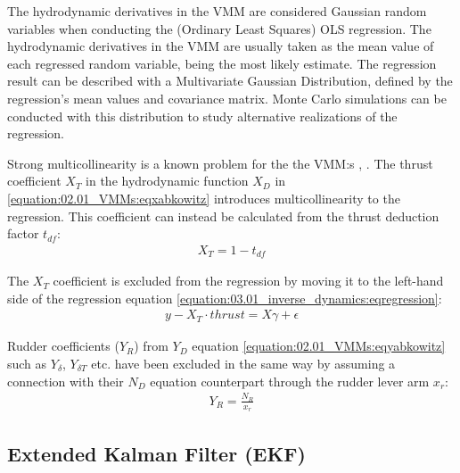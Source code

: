\documentclass[review]{elsarticle}
\begin{document}
The hydrodynamic derivatives in the VMM are considered Gaussian random variables when conducting the (Ordinary Least Squares) OLS regression. The hydrodynamic derivatives in the VMM are usually taken as the mean value of each regressed random variable, being the most likely estimate. The regression result can be described with a Multivariate Gaussian Distribution, defined by the regression's mean values and covariance matrix. Monte Carlo simulations can be conducted with this distribution to study alternative realizations of the regression.

  
Strong multicollinearity is a known problem for the the VMM:s \cite{luo_parameter_2016}, \cite{wang_quantifying_2018}.
The thrust coefficient \(X_T\) in the hydrodynamic function \(X_D\) in \autoref{equation:02.01_VMMs:eqxabkowitz} introduces multicollinearity to the regression. This coefficient can instead be calculated from the thrust deduction factor \(t_{df}\):
\begin{equation}\label{equation:03.01_inverse_dynamics:eqXthrust}
\begin{split}\displaystyle X_{T} = 1 - t_{df}\end{split}
\end{equation}
  
The \(X_T\) coefficient is excluded from the regression by moving it to the left-hand side of the regression equation \autoref{equation:03.01_inverse_dynamics:eqregression}:
\begin{equation}\label{equation:03.01_inverse_dynamics:eqexclude}
\begin{split}y-X_T \cdot thrust = X \gamma + \epsilon\end{split}
\end{equation}
  
Rudder coefficients (\(Y_R\)) from \(Y_D\) equation \autoref{equation:02.01_VMMs:eqyabkowitz} such as \(Y_{\delta}\), \(Y_{\delta T}\) etc. have been excluded in the same way by assuming a connection with their \(N_D\) equation counterpart through the rudder lever arm \(x_r\):
\begin{equation}\label{equation:03.01_inverse_dynamics:eqyr}
\begin{split}\displaystyle Y_{R} = \frac{N_{R}}{x_{r}}\end{split}
\end{equation}

\subsection{Extended Kalman Filter (EKF)}
\label{\detokenize{04.01_EK:extended-kalman-filter-ekf}}\label{\detokenize{04.01_EK::doc}}
  
\end{document}
